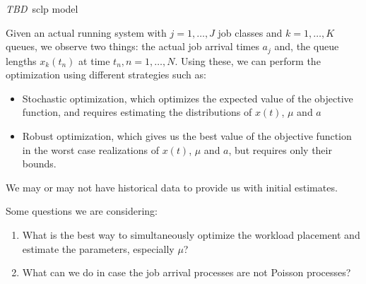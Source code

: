 \documentclass[11pt,a4paper,titlepage]{article}
\newcommand\tbd{{\color{orange}\textit{TBD}}}
\theoremstyle{definition}
\begin{document}
\tbd{~sclp model}

Given an actual running system with $j=1,\ldots,J$ job classes and $k=1,\ldots,K$ queues,
we observe two things:
the actual job arrival times $a_j$ and,
the queue lengths $x_k(t_n)$ at time $t_n, n=1,\ldots,N$.
Using these,
we can perform the optimization using different strategies such as:
\begin{itemize}
    \item Stochastic optimization, which optimizes the expected value of the objective function, and requires estimating the distributions of $x(t)$, $\mu$ and $a$
    \item Robust optimization, which gives us the best value of the objective function in the worst case realizations of $x(t)$, $\mu$ and $a$,
    but requires only their bounds.
\end{itemize}

We may or may not have historical data to provide us with initial estimates.

Some questions we are considering:

\begin{enumerate}
    \item What is the best way to simultaneously optimize the workload placement and estimate the parameters, especially $\mu$?
    \item What can we do in case the job arrival processes are not Poisson processes?
\end{enumerate}
\end{document}
